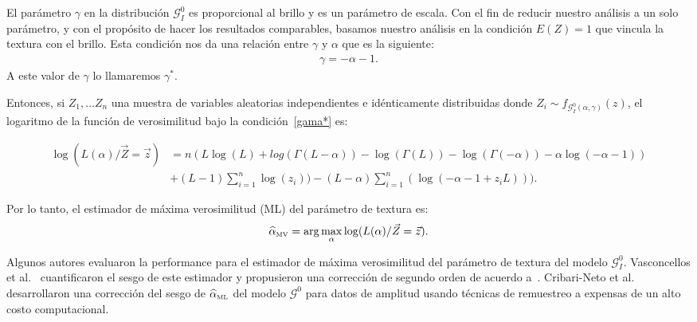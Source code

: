 El parámetro $\gamma$ en la distribución $\mathcal{G}_I^0$  es proporcional al brillo y es un parámetro de escala. Con el fin de reducir nuestro análisis a un solo parámetro, y con el propósito de hacer los resultados comparables, basamos nuestro análisis en la condición $E(Z)=1$ que vincula la textura con el brillo. Esta condición nos da una relación entre $\gamma$ y $\alpha$ que es la siguiente:
\begin{align}
\label{gama*}
\gamma=-\alpha-1. 
\end{align}
A este valor de $\gamma$ lo llamaremos $\gamma^*$.

Entonces, si $Z_1,\ldots Z_n$ una muestra de variables aleatorias independientes e idénticamente distribuidas donde $Z_i \sim f_{\mathcal G_I^0(\alpha,\gamma)}(z)$,  el logaritmo de la función de verosimilitud bajo la condición~\eqref{gama*} es:

\begin{align}
\nonumber \log(L(\alpha)/\vec{Z}=\vec{z})&=n(L \log(L)+log(\Gamma(L-\alpha))-\log(\Gamma(L))-\log(\Gamma(-\alpha))-\alpha \log(-\alpha-1))\\
& + (L-1) \sum_{i=1}^n \log(z_i))-(L-\alpha) \sum_{i=1}^n(\log(-\alpha-1+z_i L))).
\end{align}


Por lo tanto, el estimador de máxima verosimilitud (ML) del parámetro de textura es:
\begin{align}
\widehat{\alpha}_{{\text{\tiny{MV}}}}=\arg\max_{\alpha} \log(L(\alpha)/\vec{Z}=\vec{z}).
\end{align}

Algunos autores evaluaron la performance para el estimador de máxima verosimilitud del parámetro de textura del modelo  $\mathcal G_I^0$. Vasconcellos et al.~\cite{VasconcellosFrerySilva:CompStat} cuantificaron el sesgo de este estimador y propusieron una corrección de segundo orden de acuerdo a~\cite{cox1968}. Cribari-Neto et al.~\cite{CribariFrerySilva:CSDA} desarrollaron una corrección del sesgo de $\widehat{\alpha}_{\text{{\text{\tiny{ML}}}}}$ del modelo $\mathcal G^0$ para datos de amplitud usando técnicas de remuestreo a expensas de un alto costo computacional.

